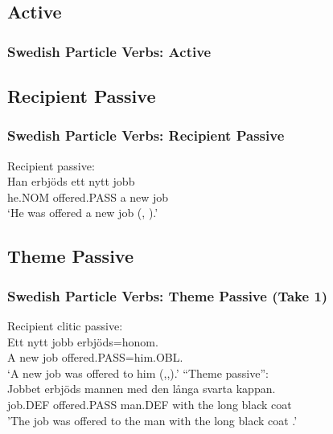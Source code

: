 \documentclass{beamer}
\begin{document}
\subsection{Active}
\begin{frame}
	\frametitle{Swedish Particle Verbs: Active}
	\begin{exe}
\end{exe}
\end{frame}
\subsection{Recipient Passive}
\begin{frame}
	\frametitle{Swedish Particle Verbs: Recipient Passive}
\begin{exe}
		\ex Recipient passive:\\
		\gll Han erbjöds ett nytt jobb\\
			he.NOM offered.PASS a new job\\
			\trans `He was offered a new job (\citealt{Anward.1989}, \citealt{Lundquist.2006}).'
\end{exe}
\end{frame}

\subsection{Theme Passive}
\begin{frame}
	\frametitle{Swedish Particle Verbs: Theme Passive (Take 1)}
	\begin{exe}
	\ex Recipient clitic passive:\\
		\gll Ett nytt jobb erbjöds=honom.\\
		A new job offered.PASS=him.OBL.\\
		\trans `A new job was offered to him (\citealt{Anward.1989},\citealt{Falk.1990},\citealt{Lundquist.2006}).'
	\ex ``Theme passive'': \\
		\gll Jobbet erbjöds mannen med den långa svarta kappan.\\
		job.DEF offered.PASS man.DEF with the long black coat\\
		'The job was offered to the man with the long black coat \citep[ex 26]{Lundquist.2004}.'
\end{exe}
\end{frame}
\end{document}

